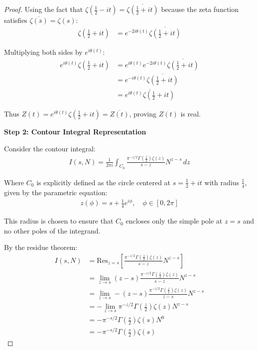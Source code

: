 \documentclass{article}
\begin{document}
\begin{proof}
Using the fact that $\zeta\left(\frac{1}{2}-it\right) = \overline{\zeta\left(\frac{1}{2}+it\right)}$ because the zeta function satisfies $\overline{\zeta(\overline{s})} = \zeta(s)$:
\begin{align}\label{eq:zeta_conjugate}
\zeta\left(\frac{1}{2}+it\right) &= e^{-2i\theta(t)}\overline{\zeta\left(\frac{1}{2}+it\right)}
\end{align}

Multiplying both sides by $e^{i\theta(t)}$:
\begin{align}
e^{i\theta(t)}\zeta\left(\frac{1}{2}+it\right) &= e^{i\theta(t)}e^{-2i\theta(t)}\overline{\zeta\left(\frac{1}{2}+it\right)} \label{eq:Z_real1}\\
&= e^{-i\theta(t)}\overline{\zeta\left(\frac{1}{2}+it\right)} \label{eq:Z_real2}\\
&= \overline{e^{i\theta(t)}\zeta\left(\frac{1}{2}+it\right)} \label{eq:Z_real3}
\end{align}

Thus $Z(t) = e^{i\theta(t)}\zeta\left(\frac{1}{2}+it\right) = \overline{Z(t)}$, proving $Z(t)$ is real.

\textbf{Step 2: Contour Integral Representation}

Consider the contour integral:
\begin{align}\label{eq:contour_integral}
I(s,N) = \frac{1}{2\pi i}\int_{C_0} \frac{\pi^{-z/2}\Gamma\left(\frac{z}{2}\right)\zeta(z)}{s-z}N^{z-s}\,dz
\end{align}

Where $C_0$ is explicitly defined as the circle centered at $s = \frac{1}{2}+it$ with radius $\frac{1}{4}$, given by the parametric equation:
\begin{align}\label{eq:contour_param}
z(\phi) = s + \frac{1}{4}e^{i\phi}, \quad \phi \in [0, 2\pi]
\end{align}

This radius is chosen to ensure that $C_0$ encloses only the simple pole at $z=s$ and no other poles of the integrand.

By the residue theorem:
\begin{align}
I(s,N) &= \text{Res}_{z=s}\left[\frac{\pi^{-z/2}\Gamma\left(\frac{z}{2}\right)\zeta(z)}{s-z}N^{z-s}\right] \label{eq:residue1}\\
&= \lim_{z\to s}(z-s)\frac{\pi^{-z/2}\Gamma\left(\frac{z}{2}\right)\zeta(z)}{s-z}N^{z-s} \label{eq:residue2}\\
&= \lim_{z\to s}-(z-s)\frac{\pi^{-z/2}\Gamma\left(\frac{z}{2}\right)\zeta(z)}{z-s}N^{z-s} \label{eq:residue3}\\
&= -\lim_{z\to s}\pi^{-z/2}\Gamma\left(\frac{z}{2}\right)\zeta(z)N^{z-s} \label{eq:residue4}\\
&= -\pi^{-s/2}\Gamma\left(\frac{s}{2}\right)\zeta(s)N^0 \label{eq:residue5}\\
&= -\pi^{-s/2}\Gamma\left(\frac{s}{2}\right)\zeta(s) \label{eq:residue_final}
\end{align}


\end{proof}
\end{document}

